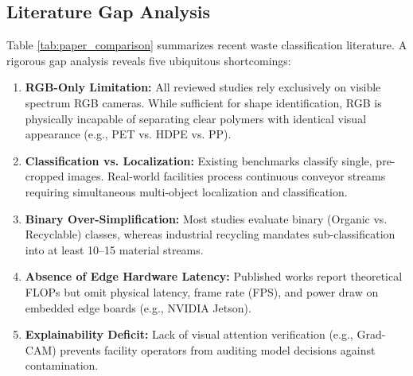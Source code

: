 \documentclass[conference]{IEEEtran}
\begin{document}
\subsection{Literature Gap Analysis}
Table \ref{tab:paper_comparison} summarizes recent waste classification literature. A rigorous gap analysis reveals five ubiquitous shortcomings:
\begin{enumerate}
    \item \textbf{RGB-Only Limitation:} All reviewed studies rely exclusively on visible spectrum RGB cameras. While sufficient for shape identification, RGB is physically incapable of separating clear polymers with identical visual appearance (e.g., PET vs. HDPE vs. PP).
    \item \textbf{Classification vs. Localization:} Existing benchmarks classify single, pre-cropped images. Real-world facilities process continuous conveyor streams requiring simultaneous multi-object localization and classification.
    \item \textbf{Binary Over-Simplification:} Most studies evaluate binary (Organic vs. Recyclable) classes, whereas industrial recycling mandates sub-classification into at least 10--15 material streams.
    \item \textbf{Absence of Edge Hardware Latency:} Published works report theoretical FLOPs but omit physical latency, frame rate (FPS), and power draw on embedded edge boards (e.g., NVIDIA Jetson).
    \item \textbf{Explainability Deficit:} Lack of visual attention verification (e.g., Grad-CAM) prevents facility operators from auditing model decisions against contamination.
\end{enumerate}
\end{document}
